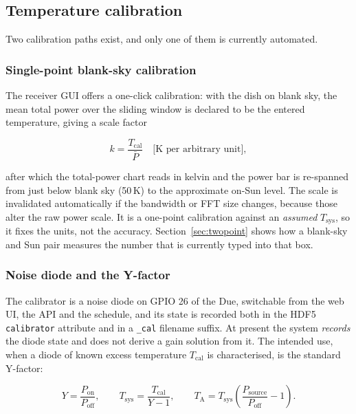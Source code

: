 \documentclass[11pt,a4paper]{article}
\begin{document}
\subsection{Temperature calibration}

Two calibration paths exist, and only one of them is currently automated.

\subsubsection{Single-point blank-sky calibration}

The receiver GUI offers a one-click calibration: with the dish on blank sky, the mean total power over the sliding window is declared to be the entered temperature, giving a scale factor

\begin{equation}
k = \frac{T_\text{cal}}{\bar{P}} \quad \text{[K per arbitrary unit]},
\end{equation}

after which the total-power chart reads in kelvin and the power bar is re-spanned from just below blank sky (50\,K) to the approximate on-Sun level. The scale is invalidated automatically if the bandwidth or FFT size changes, because those alter the raw power scale. It is a one-point calibration against an \emph{assumed} $T_\text{sys}$, so it fixes the units, not the accuracy. Section~\ref{sec:twopoint} shows how a blank-sky and Sun pair measures the number that is currently typed into that box.

\subsubsection{Noise diode and the Y-factor}

The calibrator is a noise diode on GPIO 26 of the Due, switchable from the web UI, the API and the schedule, and its state is recorded both in the HDF5 \texttt{calibrator} attribute and in a \texttt{\_cal} filename suffix. At present the system \emph{records} the diode state and does not derive a gain solution from it. The intended use, when a diode of known excess temperature $T_\text{cal}$ is characterised, is the standard Y-factor:

\begin{equation}
Y = \frac{P_\text{on}}{P_\text{off}},
\qquad
T_\text{sys} = \frac{T_\text{cal}}{Y - 1},
\qquad
T_\text{A} = T_\text{sys}\left(\frac{P_\text{source}}{P_\text{off}} - 1\right).
\end{equation}
\end{document}
